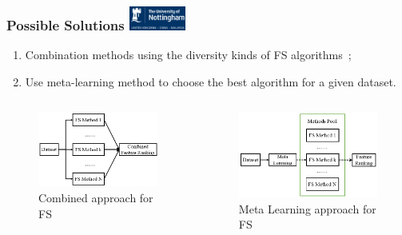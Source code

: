 \documentclass[aspectratio=1610]{beamer}
\newcommand{\UoN}
  {\hfill {\includegraphics[height=0.8cm]{nott_logo/nott_logo_white.png}}}
\begin{document}
\begin{frame}
\frametitle{Possible Solutions \UoN}

\begin{enumerate}
	\item Combination methods using the diversity kinds of FS algorithms~;
	\item Use meta-learning method to choose the best algorithm for a given dataset.
\end{enumerate}

\begin{columns}
	\begin{column}{0.5\textwidth}
		\begin{figure}
			\includegraphics[scale=0.4]{Figures/Combined_FS.png}
			\caption{\scriptsize{Combined approach for FS}}
		\end{figure}
	\end{column}

	\begin{column}{0.5\textwidth}
		\begin{figure}
			\includegraphics[scale=0.4]{Figures/Meta_FS.png}
			\caption{\scriptsize{Meta Learning approach for FS}}
		\end{figure}
	\end{column}

\end{columns}
\end{frame}
\end{document}
